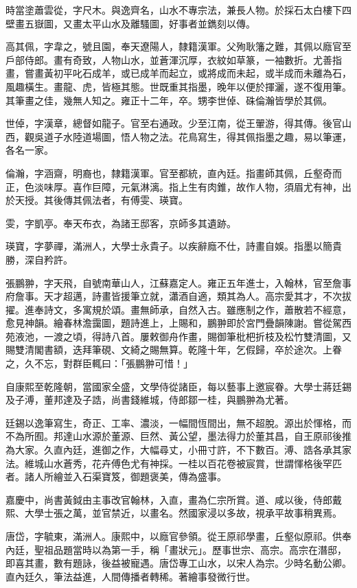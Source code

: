 \begin{pinyinscope}
時當塗蕭雲從，字尺木。與逸齊名，山水不專宗法，兼長人物。於採石太白樓下四壁畫五嶽圖，又畫太平山水及離騷圖，好事者並鐫刻以傳。

高其佩，字韋之，號且園，奉天遼陽人，隸籍漢軍。父殉耿籓之難，其佩以廕官至戶部侍郎。畫有奇致，人物山水，並蒼渾沉厚，衣紋如草篆，一袖數折。尤善指畫，嘗畫黃初平叱石成羊，或已成羊而起立，或將成而未起，或半成而未離為石，風趣橫生。畫龍、虎，皆極其態。世既重其指墨，晚年以便於揮灑，遂不復用筆。其筆畫之佳，幾無人知之。雍正十二年，卒。甥李世倬、硃倫瀚皆學於其佩。

世倬，字漢章，總督如龍子。官至右通政。少至江南，從王翬游，得其傳。後官山西，觀吳道子水陸道場圖，悟人物之法。花鳥寫生，得其佩指墨之趣，易以筆運，各名一家。

倫瀚，字涵齋，明裔也，隸籍漢軍。官至都統，直內廷。指畫師其佩，丘壑奇而正，色淡味厚。喜作巨障，元氣淋漓。指上生有肉錐，故作人物，須眉尤有神，出於天授。其後傳其佩法者，有傅雯、瑛寶。

雯，字凱亭。奉天布衣，為諸王邸客，京師多其遺跡。

瑛寶，字夢禪，滿洲人，大學士永貴子。以疾辭廕不仕，詩畫自娛。指墨以簡貴勝，深自矜許。

張鵬翀，字天飛，自號南華山人，江蘇嘉定人。雍正五年進士，入翰林，官至詹事府詹事。天才超邁，詩畫皆援筆立就，瀟酒自適，類其為人。高宗愛其才，不次拔擢。進奉詩文，多寓規於頌。畫無師承，自然入古。雖應制之作，蕭散若不經意，愈見神韻。繪春林澹靄圖，題詩進上，上賜和，鵬翀即於宮門疊韻陳謝。嘗從駕西苑液池，一渡之頃，得詩八首。屢敕御舟作畫，賜御筆枇杷折枝及松竹雙清圖，又賜雙清閣書額，迭拜筆硯、文綺之賜無算。乾隆十年，乞假歸，卒於途次。上眷之，久不忘，對群臣輒曰：「張鵬翀可惜！」

自康熙至乾隆朝，當國家全盛，文學侍從諸臣，每以藝事上邀宸眷。大學士蔣廷錫及子溥，董邦達及子誥，尚書錢維城，侍郎鄒一桂，與鵬翀為尤著。

廷錫以逸筆寫生，奇正、工率、濃淡，一幅間恆間出，無不超脫。源出於惲格，而不為所囿。邦達山水源於董源、巨然、黃公望，墨法得力於董其昌，自王原祁後推為大家。久直內廷，進御之作，大幅尋丈，小冊寸許，不下數百。溥、誥各承其家法。維城山水蒼秀，花卉傅色尤有神採。一桂以百花卷被宸賞，世謂惲格後罕匹者。諸人所繪並入石渠寶笈，御題褒美，傳為盛事。

嘉慶中，尚書黃鉞由主事改官翰林，入直，畫為仁宗所賞。道、咸以後，侍郎戴熙、大學士張之萬，並官禁近，以畫名。然國家浸以多故，視承平故事稍異焉。

唐岱，字毓東，滿洲人。康熙中，以廕官參領。從王原祁學畫，丘壑似原祁。供奉內廷，聖祖品題當時以為第一手，稱「畫狀元」。歷事世宗、高宗。高宗在潛邸，即喜其畫，數有題詠，後益被寵遇。唐岱專工山水，以宋人為宗。少時名動公卿。直內廷久，筆法益進，人間傳播者轉稀。著繪事發微行世。


\end{pinyinscope}
